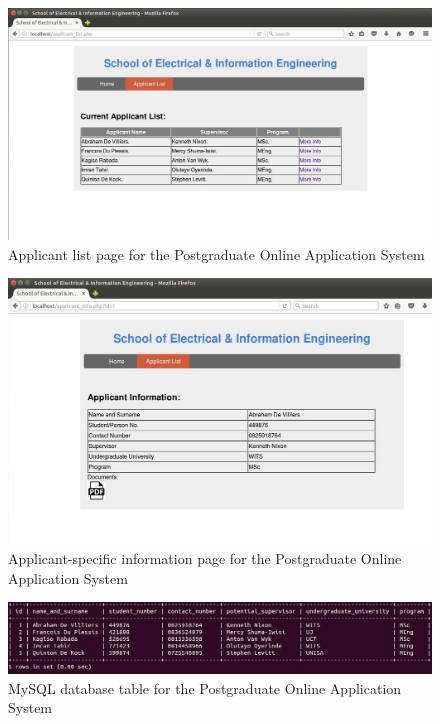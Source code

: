 \documentclass[journal]{IEEEtran}
\begin{document}
\begin{figure}[hbt]
\centering
\includegraphics[width=0.7\linewidth]{list}
\caption{Applicant list page for the Postgraduate Online Application System}
\label{ApplicantList}
\end{figure}

\begin{figure}[hbt]
\centering
\includegraphics[width=0.7\linewidth]{information}
\caption{Applicant-specific information page for the Postgraduate Online Application System}
\label{ApplicantInformation}
\end{figure}

\begin{figure}[hbt]
\centering
\includegraphics[width=0.7\linewidth]{mysql}
\caption{MySQL database table for the Postgraduate Online Application System}
\label{MySQLTable}
\end{figure}

\end{document}
